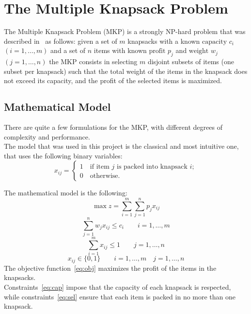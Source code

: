\chapter{The Multiple Knapsack Problem}\label{ch:mkp}
The Multiple Knapsack Problem (MKP) is a strongly NP-hard problem
that was described in~\cite{mkp:2019} as follows:
given a set of \(m\) knapsacks with a known \(\text{capacity } c_{i}\)
\((i=1,\dots,m)\) and a set of \(n\) items with
known \(\text{profit } p_{j}\) and \(\text{weight } w_{j}\) \((j=1,\dots,n)\)
the MKP consists in selecting \(m\) disjoint subsets of items
(one subset per knapsack) such that the total weight of the items in the knapsack
does not exceed its capacity, and the profit of the selected items is maximized.


\section{Mathematical Model}\label{sec:model}
There are quite a few formulations for the MKP, with different degrees of
complexity and performance.\\
The model that was used in this project is the classical and most intuitive
one, that uses the following binary variables:
\[x_{ij}=
\begin{cases*}
    1 \quad \text{if item } j \text{ is packed into knapsack } i;\\
    0 \quad \text{otherwise}.
\end{cases*}
\]

The mathematical model is the following:
\begin{equation}
    \label{eq:obj}
    \max{z} = \sum_{i=1}^{m} \sum_{j=1}^{n} p_{j} x_{ij}
\end{equation}
\begin{equation}
    \label{eq:cap}
    \sum_{j=1}^{n} w_{j} x_{ij} \leq c_{i} \qquad i=1,\dots,m
\end{equation}
\begin{equation}
    \label{eq:sel}
    \sum_{i=1}^{m} x_{ij} \leq 1 \qquad j=1,\dots,n
\end{equation}
\begin{equation}
    x_{ij} \in \{0,1\} \qquad i=1,\dots,m \quad j=1,\dots,n
\end{equation}
The objective function~\eqref{eq:obj} maximizes the profit
of the items in the knapsacks.\\
Constraints~\eqref{eq:cap} impose that the capacity of each knapsack is respected,
while constraints~\eqref{eq:sel} ensure that each item
is packed in no more than one knapsack.

